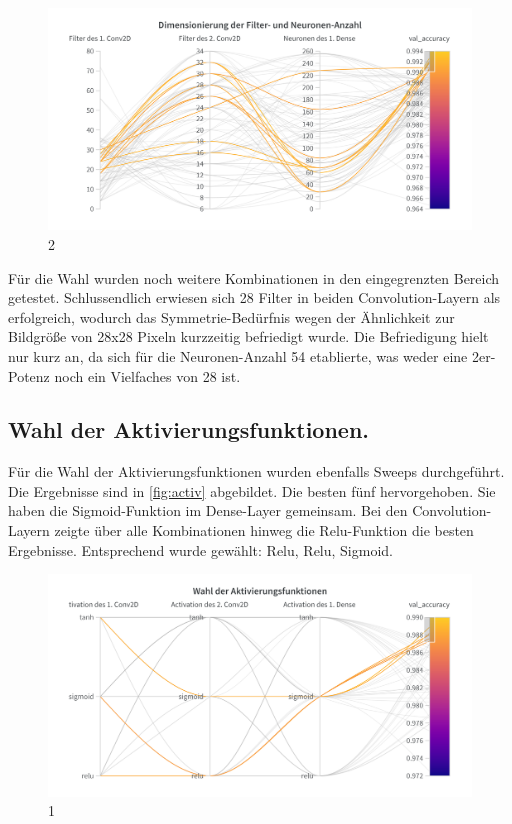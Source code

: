 \documentclass[
fontsize=12pt,					%
paper=a4,						%
twoside=true, 					%
listof=totoc, 					%
bibliography=totoc,				%
titlepage, 						%
headsepline, 					%
DIV=12,							%
BCOR=6mm,						%
cleardoublepage=empty,			%
parskip,							%
ngerman
]{scrartcl}
\begin{document}
\begin{figure}
	\centering
	\includegraphics[width=0.7\linewidth]{images/Filter}
	\caption{2}
	\label{fig:filter}
\end{figure}

Für die Wahl wurden noch weitere Kombinationen in den eingegrenzten Bereich getestet. Schlussendlich erwiesen sich 28 Filter in beiden Convolution-Layern als erfolgreich, wodurch das Symmetrie-Bedürfnis wegen der Ähnlichkeit zur Bildgröße von 28x28 Pixeln kurzzeitig befriedigt wurde. Die Befriedigung hielt nur kurz an, da sich für die Neuronen-Anzahl 54 etablierte, was weder eine 2er-Potenz noch ein Vielfaches von 28 ist.\\

\subsection{Wahl der Aktivierungsfunktionen.}

Für die Wahl der Aktivierungsfunktionen wurden ebenfalls Sweeps durchgeführt. Die Ergebnisse sind in \autoref{fig:activ} abgebildet. Die besten fünf hervorgehoben. Sie haben die Sigmoid-Funktion im Dense-Layer gemeinsam. Bei den Convolution-Layern zeigte über alle Kombinationen hinweg die Relu-Funktion die besten Ergebnisse. Entsprechend wurde gewählt: Relu, Relu, Sigmoid.

\begin{figure}
	\centering
	\includegraphics[width=0.7\linewidth]{images/Activ}
	\caption{1}
	\label{fig:activ}
\end{figure}
\end{document}
